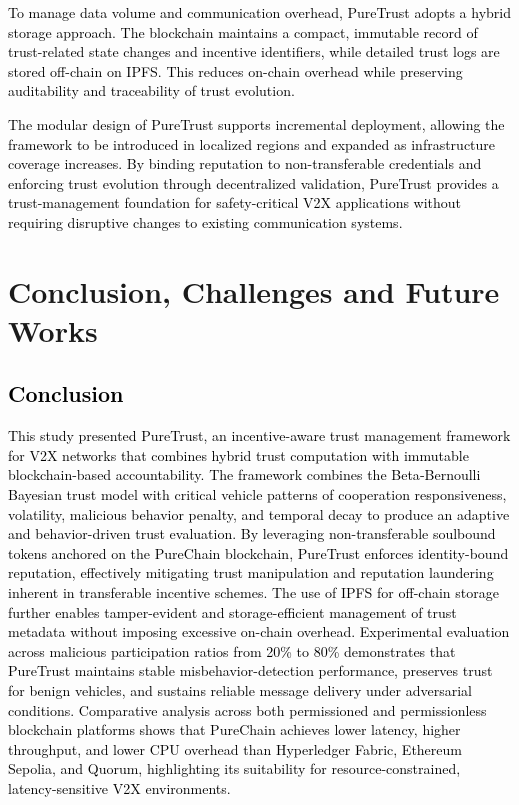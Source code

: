 \cite{cho2010survey}\documentclass[journal,comsoc,twoside]{IEEEtran}
\begin{document}
\textcolor{black}{
To manage data volume and communication overhead, PureTrust adopts a hybrid storage approach. The blockchain maintains a compact, immutable record of trust-related state changes and incentive identifiers, while detailed trust logs are stored off-chain on IPFS. This reduces on-chain overhead while preserving auditability and traceability of trust evolution.}

\textcolor{black}{
The modular design of PureTrust supports incremental deployment, allowing the framework to be introduced in localized regions and expanded as infrastructure coverage increases. By binding reputation to non-transferable credentials and enforcing trust evolution through decentralized validation, PureTrust provides a trust-management foundation for safety-critical V2X applications without requiring disruptive changes to existing communication systems.}


\section{Conclusion, Challenges and Future Works} 
\textcolor{black}{
\subsection{Conclusion}
This study presented PureTrust, an incentive-aware trust management framework for V2X networks that combines hybrid trust computation with immutable blockchain-based accountability. The framework combines the Beta‑Bernoulli Bayesian trust model with critical vehicle patterns of cooperation responsiveness, volatility, malicious behavior penalty, and temporal decay to produce an adaptive and behavior-driven trust evaluation. By leveraging non-transferable soulbound tokens anchored on the PureChain blockchain, PureTrust enforces identity-bound reputation, effectively mitigating trust manipulation and reputation laundering inherent in transferable incentive schemes. The use of IPFS for off-chain storage further enables tamper-evident and storage-efficient management of trust metadata without imposing excessive on-chain overhead.
Experimental evaluation across malicious participation ratios from 20\% to 80\% demonstrates that PureTrust maintains stable misbehavior-detection performance, preserves trust for benign vehicles, and sustains reliable message delivery under adversarial conditions. Comparative analysis across both permissioned and permissionless blockchain platforms shows that PureChain achieves lower latency, higher throughput, and lower CPU overhead than Hyperledger Fabric, Ethereum Sepolia, and Quorum, highlighting its suitability for resource-constrained, latency-sensitive V2X environments.}
\end{document}
